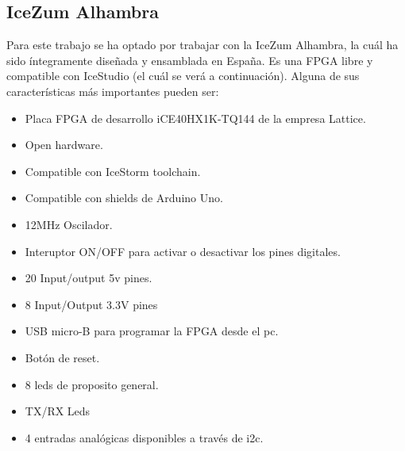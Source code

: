 \subsection{IceZum Alhambra}
Para este trabajo se ha optado por trabajar con la IceZum Alhambra, la cuál ha sido íntegramente diseñada y ensamblada en España.\newline
Es una FPGA libre y compatible con IceStudio (el cuál se verá a continuación). Alguna de sus características más importantes pueden ser:
\begin{itemize}
	\item Placa FPGA de desarrollo iCE40HX1K-TQ144 de la empresa Lattice. 
	\item Open hardware.
	\item Compatible con IceStorm toolchain.
	\item Compatible con shields de Arduino Uno. 
	\item 12MHz Oscilador.
	\item Interuptor ON/OFF para activar o desactivar los pines digitales.
	\item 20 Input/output 5v pines.
	\item 8 Input/Output 3.3V pines
	\item USB micro-B para programar la FPGA desde el pc.
	\item Botón de reset.
	\item 8 leds de proposito general.
	\item TX/RX Leds
	\item 4 entradas analógicas disponibles a través de i2c.
\end{itemize}

